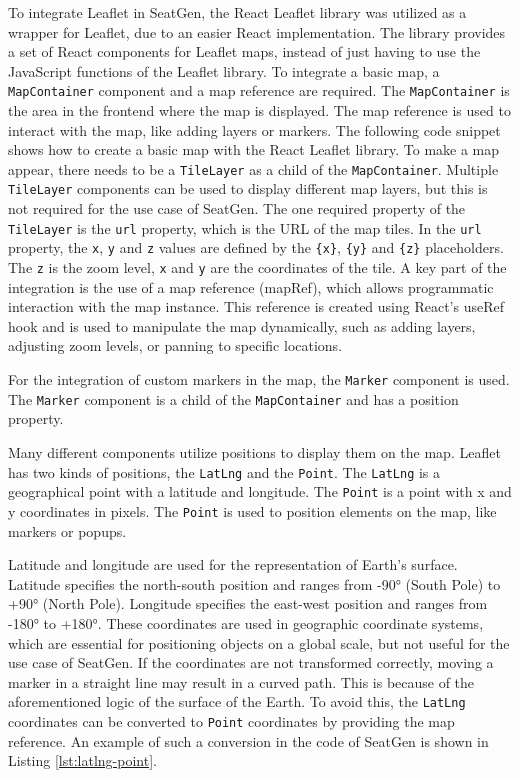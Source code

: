 To integrate Leaflet \cite{LeafletGitHub} in SeatGen, the React Leaflet library \cite{ReactLeafletDocs2} was utilized as a wrapper for Leaflet, due to an easier React implementation. The library provides a set of React components for Leaflet maps, instead of just having to use the JavaScript functions of the Leaflet library. To integrate a basic map, a \texttt{MapContainer} component and a map reference are required. The \texttt{MapContainer} is the area in the frontend where the map is displayed. The map reference is used to interact with the map, like adding layers or markers. The following code snippet shows how to create a basic map with the React Leaflet library. To make a map appear, there needs to be a \texttt{TileLayer} as a child of the \texttt{MapContainer}. Multiple \texttt{TileLayer} components can be used to display different map layers, but this is not required for the use case of SeatGen. The one required property of the \texttt{TileLayer} is the \texttt{url} property, which is the URL of the map tiles. In the \texttt{url} property, the \texttt{x}, \texttt{y} and \texttt{z} values are defined by the \texttt{\{x\}}, \texttt{\{y\}} and \texttt{\{z\}} placeholders. The \texttt{z} is the zoom level, \texttt{x} and \texttt{y} are the coordinates of the tile. A key part of the integration is the use of a map reference (mapRef), which allows programmatic interaction with the map instance. This reference is created using React’s useRef hook and is used to manipulate the map dynamically, such as adding layers, adjusting zoom levels, or panning to specific locations.

For the integration of custom markers in the map, the \texttt{Marker} component is used. The \texttt{Marker} component is a child of the \texttt{MapContainer} and has a position property.

Many different components utilize positions to display them on the map. Leaflet has two kinds of positions, the \texttt{LatLng} and the \texttt{Point}. The \texttt{LatLng} is a geographical point with a latitude and longitude. The \texttt{Point} is a point with x and y coordinates in pixels. The \texttt{Point} is used to position elements on the map, like markers or popups. 

Latitude and longitude are used for the representation of Earth's surface. Latitude specifies the north-south position and ranges from -90° (South Pole) to +90° (North Pole). Longitude specifies the east-west position and ranges from -180° to +180°. These coordinates are used in geographic coordinate systems, which are essential for positioning objects on a global scale, but not useful for the use case of SeatGen. If the coordinates are not transformed correctly, moving a marker in a straight line may result in a curved path. This is because of the aforementioned logic of the surface of the Earth. To avoid this, the \texttt{LatLng} coordinates can be converted to \texttt{Point} coordinates by providing the map reference. An example of such a conversion in the code of SeatGen is shown in Listing \ref{lst:latlng-point}.


